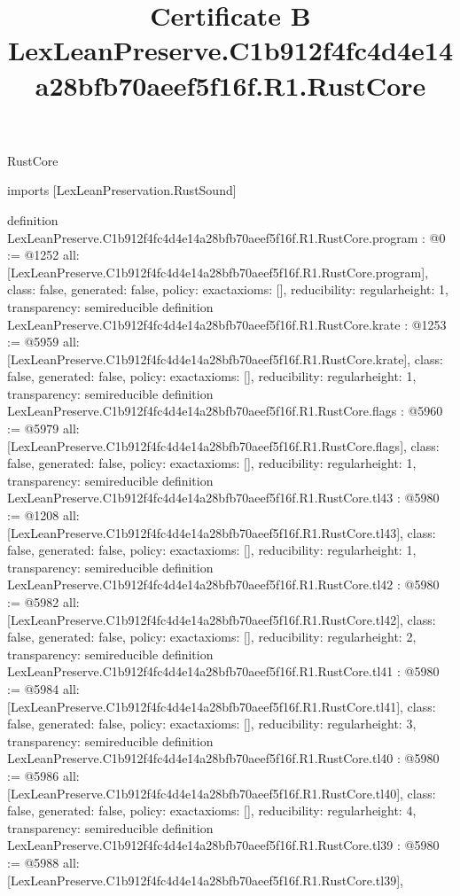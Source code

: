 \begin{lexlean}{RustCore}
\title{Certificate B LexLeanPreserve.C1b912f4fc4d4e14a28bfb70aeef5f16f.R1.RustCore}
\begin{coremodule}
imports [LexLeanPreservation.RustSound]

definition LexLeanPreserve.C1b912f4fc4d4e14a28bfb70aeef5f16f.R1.RustCore.program : @0 := @1252 {
  all: [LexLeanPreserve.C1b912f4fc4d4e14a28bfb70aeef5f16f.R1.RustCore.program],
  class: false,
  generated: false,
  policy: exact{axioms: []},
  reducibility: regular{height: 1},
  transparency: semireducible
}
definition LexLeanPreserve.C1b912f4fc4d4e14a28bfb70aeef5f16f.R1.RustCore.krate : @1253 := @5959 {
  all: [LexLeanPreserve.C1b912f4fc4d4e14a28bfb70aeef5f16f.R1.RustCore.krate],
  class: false,
  generated: false,
  policy: exact{axioms: []},
  reducibility: regular{height: 1},
  transparency: semireducible
}
definition LexLeanPreserve.C1b912f4fc4d4e14a28bfb70aeef5f16f.R1.RustCore.flags : @5960 := @5979 {
  all: [LexLeanPreserve.C1b912f4fc4d4e14a28bfb70aeef5f16f.R1.RustCore.flags],
  class: false,
  generated: false,
  policy: exact{axioms: []},
  reducibility: regular{height: 1},
  transparency: semireducible
}
definition LexLeanPreserve.C1b912f4fc4d4e14a28bfb70aeef5f16f.R1.RustCore.tl43 : @5980 := @1208 {
  all: [LexLeanPreserve.C1b912f4fc4d4e14a28bfb70aeef5f16f.R1.RustCore.tl43],
  class: false,
  generated: false,
  policy: exact{axioms: []},
  reducibility: regular{height: 1},
  transparency: semireducible
}
definition LexLeanPreserve.C1b912f4fc4d4e14a28bfb70aeef5f16f.R1.RustCore.tl42 : @5980 := @5982 {
  all: [LexLeanPreserve.C1b912f4fc4d4e14a28bfb70aeef5f16f.R1.RustCore.tl42],
  class: false,
  generated: false,
  policy: exact{axioms: []},
  reducibility: regular{height: 2},
  transparency: semireducible
}
definition LexLeanPreserve.C1b912f4fc4d4e14a28bfb70aeef5f16f.R1.RustCore.tl41 : @5980 := @5984 {
  all: [LexLeanPreserve.C1b912f4fc4d4e14a28bfb70aeef5f16f.R1.RustCore.tl41],
  class: false,
  generated: false,
  policy: exact{axioms: []},
  reducibility: regular{height: 3},
  transparency: semireducible
}
definition LexLeanPreserve.C1b912f4fc4d4e14a28bfb70aeef5f16f.R1.RustCore.tl40 : @5980 := @5986 {
  all: [LexLeanPreserve.C1b912f4fc4d4e14a28bfb70aeef5f16f.R1.RustCore.tl40],
  class: false,
  generated: false,
  policy: exact{axioms: []},
  reducibility: regular{height: 4},
  transparency: semireducible
}
definition LexLeanPreserve.C1b912f4fc4d4e14a28bfb70aeef5f16f.R1.RustCore.tl39 : @5980 := @5988 {
  all: [LexLeanPreserve.C1b912f4fc4d4e14a28bfb70aeef5f16f.R1.RustCore.tl39],
}
\end{coremodule}
\end{lexlean}
